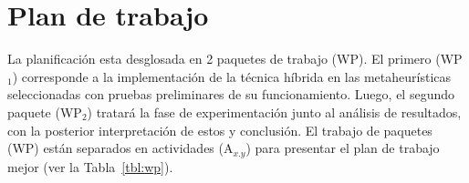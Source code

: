 

\section{Plan de trabajo}
\label{sc:PT}
La planificación esta desglosada en 2 paquetes de trabajo (WP). El primero (WP$_{1}$) corresponde a la implementación de la técnica híbrida en las metaheurísticas seleccionadas con pruebas preliminares de su funcionamiento. Luego, el segundo paquete (WP$_{2}$) tratará la fase de experimentación junto al análisis de resultados, con la posterior interpretación de estos y conclusión. El trabajo de paquetes (WP) están separados en actividades (A$_{x.y}$) para presentar el plan de trabajo mejor (ver la Tabla~\ref{tbl:wp}).



